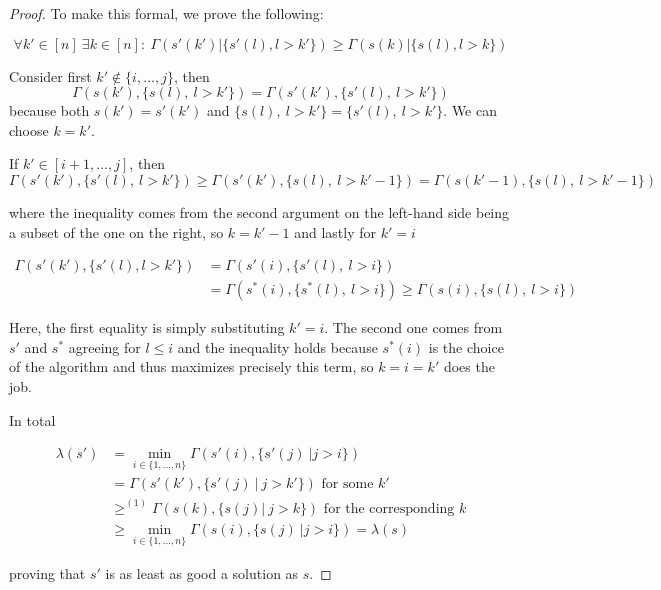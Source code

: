 \documentclass[a4paper,11pt]{article}
\begin{document}
\begin{proof}
  To make this formal, we prove the following:

  \begin{equation}
    \forall k'\in[n]\ \exists k\in[n]:\ \Gamma(s'(k')|\{s'(l), l>k'\})\geq\Gamma(s(k)|\{s(l), l>k\})
  \end{equation}

  Consider first $k'\notin \{i,\dots,j\}$, then
  \[\Gamma(s(k'),\{s(l),\ l>k'\}) = \Gamma(s'(k'),\{s'(l),\ l>k'\})\]
  because both $s(k')=s'(k')$ and $\{s(l),\ l>k'\}=\{s'(l),\ l>k'\}$. We can choose $k=k'$.

  If $k'\in [i+1,\dots,j]$, then
  \[ \Gamma(s'(k'),\{s'(l),\ l>k'\}) \geq \Gamma(s'(k'),\{s(l),\ l>k'-1\}) = \Gamma(s(k'-1),\{s(l),\ l>k'-1\})\]

  where the inequality comes from the second argument on the left-hand side being a subset of the one on the right, so $k=k'-1$ and lastly for $k'=i$

  \begin{equation*}
    \begin{split}
      \Gamma(s'(k'),\{s'(l), l>k'\}) &= \Gamma(s'(i),\{s'(l),\ l>i\})\\
      &=\Gamma(s^*(i),\{s^*(l),\ l>i\})\geq\Gamma(s(i),\{s(l),\ l>i\})
    \end{split}
  \end{equation*}

  Here, the first equality is simply substituting $k'=i$. The second one comes from $s'$ and $s^*$ agreeing for $l\leq i$ and the inequality holds because $s^*(i)$ is the choice of the algorithm and thus maximizes precisely this term, so $k=i=k'$ does the job.

  In total

  \begin{equation*}
    \begin{split}
      \lambda(s') &=  \min_{i \in \{1,\dots,n\}} \Gamma(s'(i), \{s'(j)\ | j > i\})\\
      &= \Gamma(s'(k'), \{s'(j)\ |\ j > k'\}) \text{ for some }k'\\
      &\geq^{(1)} \Gamma(s(k), \{s(j)|\ j>k \}) \text{ for the corresponding }k\\
      &\geq \min_{i \in \{1,\dots,n\}} \Gamma(s(i), \{s(j)\ | j > i\}) = \lambda(s)
    \end{split}
  \end{equation*}

  proving that $s'$ is as least as good a solution as $s$.
\end{proof}
\end{document}
